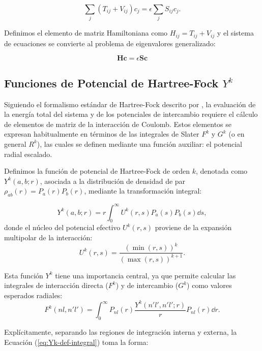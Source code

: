 \[ \sum_j (T_{ij} + V_{ij})c_j = \epsilon \sum_j S_{ij}c_j. \]

Definimos el elemento de matriz Hamiltoniana como \( H_{ij} = T_{ij} + V_{ij} \) y el sistema de ecuaciones se convierte al problema de eigenvalores generalizado:

\begin{equation}
\label{eq:eigen}
\bm{H}\bm{c} = \epsilon \bm{S}\bm{c}
\end{equation}

\subsection{Funciones de Potencial de Hartree-Fock $Y^k$}

Siguiendo el formalismo estándar de Hartree-Fock descrito por \textcite{fischer1977}, la evaluación de la energía total del sistema y de los potenciales de intercambio requiere el cálculo de elementos de matriz de la interacción de Coulomb. Estos elementos se expresan habitualmente en términos de las integrales de Slater $F^k$ y $G^k$ (o en general $R^k$), las cuales se definen mediante una función auxiliar: el potencial radial escalado.

Definimos la función de potencial de Hartree-Fock de orden $k$, denotada como $Y^k(a,b;r)$, asociada a la distribución de densidad de par $\rho_{ab}(r) = P_a(r)P_b(r)$, mediante la transformación integral:

\begin{equation}
\label{eq:Yk-def-integral}
    Y^k(a,b;r) = r \int_0^{\infty} U^k(r,s) P_a(s)P_b(s) \dd{s},
\end{equation}
donde el núcleo del potencial efectivo $U^k(r,s)$ proviene de la expansión multipolar de la interacción:
\begin{equation}
    U^k(r,s) = \frac{(\min(r,s))^k}{(\max(r,s))^{k+1}}.
\end{equation}

Esta función $Y^k$ tiene una importancia central, ya que permite calcular las integrales de interacción directa ($F^k$) y de intercambio ($G^k$) como valores esperados radiales:
\begin{equation}
    F^k(nl, n'l') = \int_0^{\infty} P_{nl}(r) \frac{Y^k(n'l', n'l'; r)}{r} P_{nl}(r) \dd{r}.
\end{equation}

Explícitamente, separando las regiones de integración interna y externa, la Ecuación (\ref{eq:Yk-def-integral}) toma la forma:

